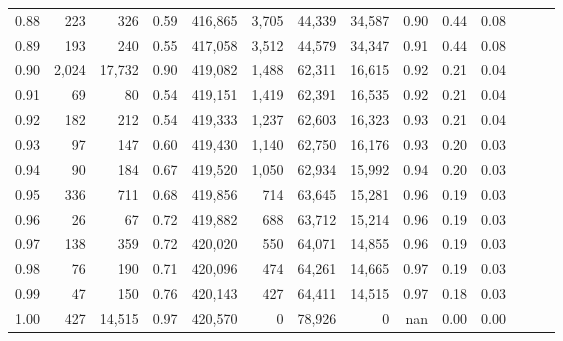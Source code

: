 \begin{tabular}{rrrrrrrrrrrrrr}
0.88 &     223 &     326 &  0.59 &  416,865 &    3,705 &  44,339 &  34,587 &  0.90 &  0.44 &      0.08 \\
0.89 &     193 &     240 &  0.55 &  417,058 &    3,512 &  44,579 &  34,347 &  0.91 &  0.44 &      0.08 \\
0.90 &   2,024 &  17,732 &  0.90 &  419,082 &    1,488 &  62,311 &  16,615 &  0.92 &  0.21 &      0.04 \\
0.91 &      69 &      80 &  0.54 &  419,151 &    1,419 &  62,391 &  16,535 &  0.92 &  0.21 &      0.04 \\
0.92 &     182 &     212 &  0.54 &  419,333 &    1,237 &  62,603 &  16,323 &  0.93 &  0.21 &      0.04 \\
0.93 &      97 &     147 &  0.60 &  419,430 &    1,140 &  62,750 &  16,176 &  0.93 &  0.20 &      0.03 \\
0.94 &      90 &     184 &  0.67 &  419,520 &    1,050 &  62,934 &  15,992 &  0.94 &  0.20 &      0.03 \\
0.95 &     336 &     711 &  0.68 &  419,856 &      714 &  63,645 &  15,281 &  0.96 &  0.19 &      0.03 \\
0.96 &      26 &      67 &  0.72 &  419,882 &      688 &  63,712 &  15,214 &  0.96 &  0.19 &      0.03 \\
0.97 &     138 &     359 &  0.72 &  420,020 &      550 &  64,071 &  14,855 &  0.96 &  0.19 &      0.03 \\
0.98 &      76 &     190 &  0.71 &  420,096 &      474 &  64,261 &  14,665 &  0.97 &  0.19 &      0.03 \\
0.99 &      47 &     150 &  0.76 &  420,143 &      427 &  64,411 &  14,515 &  0.97 &  0.18 &      0.03 \\
1.00 &     427 &  14,515 &  0.97 &  420,570 &        0 &  78,926 &       0 &   nan &  0.00 &      0.00 \\
\bottomrule
\end{tabular}
